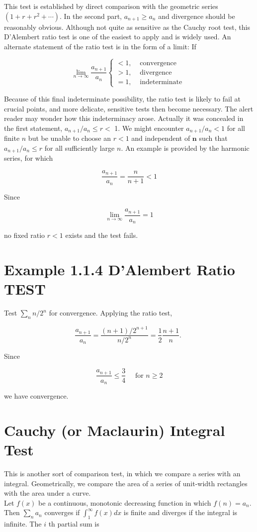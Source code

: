 \documentclass[10pt]{article}
\begin{document}
This test is established by direct comparison with the geometric series $\left(1+r+r^{2}+\cdots\right)$. In the second part, $a_{n+1} \geq a_{n}$ and divergence should be reasonably obvious. Although not quite as sensitive as the Cauchy root test, this D'Alembert ratio test is one of the easiest to apply and is widely used. An alternate statement of the ratio test is in the form of a limit: If

\[
\lim _{n \rightarrow \infty} \frac{a_{n+1}}{a_{n}} \begin{cases}<1, & \text { convergence }  \tag{1.6}\\ >1, & \text { divergence } \\ =1, & \text { indeterminate }\end{cases}
\]

Because of this final indeterminate possibility, the ratio test is likely to fail at crucial points, and more delicate, sensitive tests then become necessary. The alert reader may wonder how this indeterminacy arose. Actually it was concealed in the first statement, $a_{n+1} / a_{n} \leq r<$ 1. We might encounter $a_{n+1} / a_{n}<1$ for all finite $n$ but be unable to choose an $r<1$ and independent of $\mathbf{n}$ such that $a_{n+1} / a_{n} \leq r$ for all sufficiently large $n$. An example is provided by the harmonic series, for which

$$
\frac{a_{n+1}}{a_{n}}=\frac{n}{n+1}<1
$$

Since

$$
\lim _{n \rightarrow \infty} \frac{a_{n+1}}{a_{n}}=1
$$

no fixed ratio $r<1$ exists and the test fails.

\section*{Example 1.1.4 D'Alembert Ratio TEST}
Test $\sum_{n} n / 2^{n}$ for convergence. Applying the ratio test,

$$
\frac{a_{n+1}}{a_{n}}=\frac{(n+1) / 2^{n+1}}{n / 2^{n}}=\frac{1}{2} \frac{n+1}{n} \text {. }
$$

Since

$$
\frac{a_{n+1}}{a_{n}} \leq \frac{3}{4} \quad \text { for } n \geq 2
$$

we have convergence.

\section*{Cauchy (or Maclaurin) Integral Test}
This is another sort of comparison test, in which we compare a series with an integral. Geometrically, we compare the area of a series of unit-width rectangles with the area under a curve.\\
Let $f(x)$ be a continuous, monotonic decreasing function in which $f(n)=a_{n}$. Then $\sum_{n} a_{n}$ converges if $\int_{1}^{\infty} f(x) d x$ is finite and diverges if the integral is infinite. The $i$ th partial sum is
\end{document}
